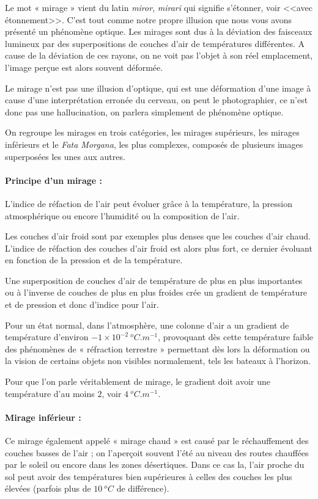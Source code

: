 \documentclass[a4paper, 12pt, onecolumn, openany]{report}
\begin{document}
	Le mot « mirage » vient du latin \textit{miror}, \textit{mirari} qui signifie s’étonner, voir <<avec étonnement>>. C’est tout comme notre propre illusion que nous vous avons présenté un phénomène optique. Les mirages sont dus à la déviation des faisceaux lumineux par des superpositions de couches d’air de températures différentes.  
A cause de la déviation de ces rayons, on ne voit pas l’objet à son réel emplacement, l’image perçue est alors souvent déformée. 
	
	Le mirage n’est pas une illusion d’optique, qui est une déformation d’une image à cause d’une interprétation erronée du cerveau, on peut le photographier, ce n’est donc pas une hallucination, on parlera simplement de phénomène optique. 
	
	On regroupe les mirages en trois catégories, les mirages supérieurs, les mirages inférieurs et le \textit{Fata Morgana}, les plus complexes, composés de plusieurs images superposées les unes aux autres. 

\paragraph{Principe d'un mirage :}
	L’indice de réfaction de l’air peut évoluer grâce à la température, la pression atmosphérique ou encore l’humidité ou la composition de l’air. 

	Les couches d’air froid sont par exemples plus denses que les couches d’air chaud. 
L’indice de réfaction des couches d’air froid est alors plus fort, ce dernier évoluant en fonction de la pression et de la température. 

	Une superposition de couches d’air de température de plus en plus importantes ou à l’inverse de couches de plus en plus froides crée un gradient de température et de pression et donc d’indice pour l’air. 

	Pour un état normal, dans l’atmosphère, une colonne d’air a un gradient de température d’environ $-1\times 10^{-2} ~^{o}C.m^{-1}$, provoquant dès cette température faible des phénomènes de « réfraction terrestre » permettant dès lors la déformation ou la vision de certains objets non visibles normalement, tels les bateaux à l’horizon. 
	
	Pour que l’on parle véritablement de mirage, le gradient doit avoir une température d’au moins $2$, voir $4 ~^{o}C.m^{-1}$. 


\paragraph{Mirage inférieur :}
	Ce mirage également appelé « mirage chaud » est causé par le réchauffement des couches basses de l’air ; on l’aperçoit souvent l’été au niveau des routes chauffées par le soleil ou encore dans les zones désertiques. 
Dans ce cas la, l’air proche du sol peut avoir des températures bien supérieures à celles des couches les plus élevées (parfois plus de $10 ~^{o}C$ de différence).
\end{document}
